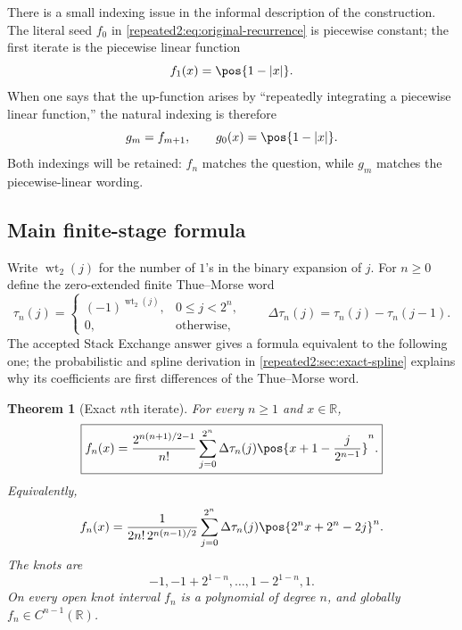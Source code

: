 \documentclass[11pt,oneside]{article}
\newtheorem{theorem}{Theorem}[section]
\theoremstyle{definition}
\theoremstyle{remark}
\newcommand{\R}{\mathbb R}
\newcommand{\wt}{\operatorname{wt}_2}
\begin{document}
There is a small indexing issue in the informal description of the construction.  The
literal seed $f_0$ in \eqref{repeated2:eq:original-recurrence} is piecewise constant; the first iterate
is the piecewise linear function
\begin{equation}
 f_1(x)=\pos{1-|x|}.
 \label{repeated2:eq:tent}
\end{equation}
When one says that the up-function arises by ``repeatedly integrating a piecewise linear
function,'' the natural indexing is therefore
\begin{equation}
 g_m=f_{m+1},\qquad g_0(x)=\pos{1-|x|}.
 \label{repeated2:eq:linear-indexing}
\end{equation}
Both indexings will be retained: $f_n$ matches the question, while $g_m$ matches the
piecewise-linear wording.

\subsection{Main finite-stage formula}

Write $\wt(j)$ for the number of $1$'s in the binary expansion of $j$.  For $n\ge0$ define
the zero-extended finite Thue--Morse word
\begin{equation}
 \tau_n(j)=
 \begin{cases}
  (-1)^{\wt(j)},&0\le j<2^n,\\
  0,&\text{otherwise},
 \end{cases}
 \qquad
 \Delta\tau_n(j)=\tau_n(j)-\tau_n(j-1).
 \label{repeated2:eq:tau-definition}
\end{equation}
The accepted Stack Exchange answer gives a formula equivalent to the following one; the
probabilistic and spline derivation in \cref{repeated2:sec:exact-spline} explains why its coefficients
are first differences of the Thue--Morse word.

\begin{theorem}[Exact $n$th iterate]
\label{repeated2:thm:exact-iterate-intro}
For every $n\ge1$ and $x\in\R$,
\begin{equation}
 \boxed{\displaystyle
 f_n(x)=\frac{2^{n(n+1)/2-1}}{n!}
 \sum_{j=0}^{2^n}\Delta\tau_n(j)
 \pos{x+1-\frac{j}{2^{n-1}}}^{n}.}
 \label{repeated2:eq:exact-iterate-intro}
\end{equation}
Equivalently,
\begin{equation}
 f_n(x)=\frac{1}{2n!\,2^{n(n-1)/2}}
 \sum_{j=0}^{2^n}\Delta\tau_n(j)
 \pos{2^nx+2^n-2j}^{n}.
 \label{repeated2:eq:exact-iterate-mse-scaling}
\end{equation}
The knots are
\begin{equation}
 -1,-1+2^{1-n},\ldots,1-2^{1-n},1.
 \label{repeated2:eq:iterate-knots}
\end{equation}
On every open knot interval $f_n$ is a polynomial of degree $n$, and globally
$f_n\in C^{n-1}(\R)$.
\end{theorem}
\end{document}
